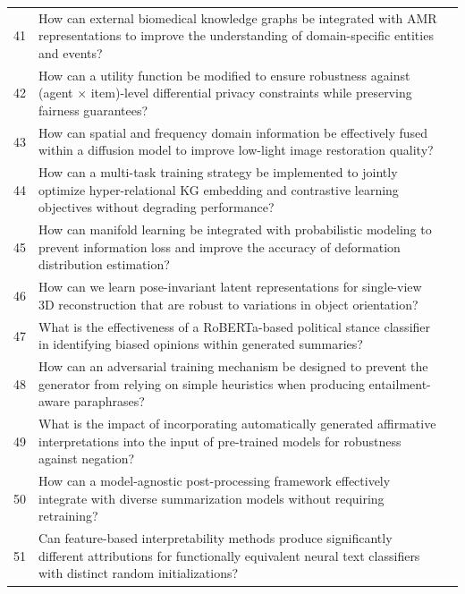 \begin{longtable}{p{0.8cm}p{9cm}p{2.5cm}}
41 & How can external biomedical knowledge graphs be integrated with AMR representations to improve the understanding of domain-specific entities and events? & \cite{10.18653/v1/2021.acl-long.489} \\
42 & How can a utility function be modified to ensure robustness against (agent × item)-level differential privacy constraints while preserving fairness guarantees? & \cite{10.1609/aaai.v37i5.25721} \\
43 & How can spatial and frequency domain information be effectively fused within a diffusion model to improve low-light image restoration quality? & \cite{10.1609/aaai.v38i5.28273} \\
44 & How can a multi-task training strategy be implemented to jointly optimize hyper-relational KG embedding and contrastive learning objectives without degrading performance? & \cite{10.18653/v1/2024.findings-acl.171} \\
45 & How can manifold learning be integrated with probabilistic modeling to prevent information loss and improve the accuracy of deformation distribution estimation? & \cite{10.1609/aaai.v36i11.21637} \\
46 & How can we learn pose-invariant latent representations for single-view 3D reconstruction that are robust to variations in object orientation? & \cite{10.1609/aaai.v36i1.19920} \\
47 & What is the effectiveness of a RoBERTa-based political stance classifier in identifying biased opinions within generated summaries? & \cite{10.48550/arxiv.2402.00322} \\
48 & How can an adversarial training mechanism be designed to prevent the generator from relying on simple heuristics when producing entailment-aware paraphrases? & \cite{10.1609/aaai.v36i10.21376} \\
49 & What is the impact of incorporating automatically generated affirmative interpretations into the input of pre-trained models for robustness against negation? & \cite{10.18653/v1/2024.acl-short.55} \\
50 & How can a model-agnostic post-processing framework effectively integrate with diverse summarization models without requiring retraining? & \cite{10.18653/v1/2024.findings-acl.59} \\
51 & Can feature-based interpretability methods produce significantly different attributions for functionally equivalent neural text classifiers with distinct random initializations? & \cite{10.18653/v1/2021.findings-acl.327} \\

\end{longtable}
